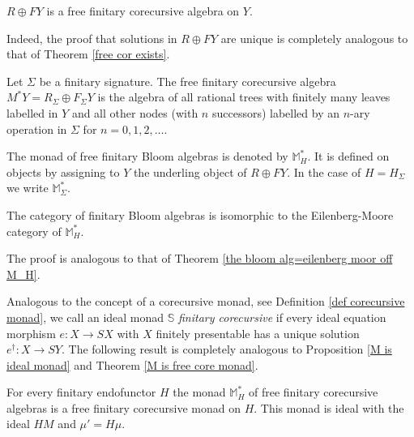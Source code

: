 \documentclass{LMCS}
\theoremstyle{plain}
\theoremstyle{definition}
\numberwithin{equation}{section}
\begin{document}
\begin{cor}
$R\oplus FY$ is a free finitary corecursive algebra on $Y$.
\end{cor}
Indeed, the proof that solutions in $R\oplus FY$ are unique is completely analogous to that of Theorem \ref{free cor exists}.


\begin{exa}
Let $\Sigma$ be a finitary signature. The free finitary corecursive algebra $M^*Y=R_\Sigma\oplus F_\Sigma Y$ is the algebra of all rational trees with finitely many leaves labelled in $Y$ and all other nodes (with $n$ successors) labelled by an $n$-ary operation in $\Sigma$ for $n=0, 1, 2, \ldots$.
\end{exa}


\begin{nota}
The monad of free finitary Bloom algebras is denoted by $\mathbb M_H^*$. It is defined on objects by assigning to $Y$ the underling object of $R\oplus FY$. In the case of $H=H_\Sigma$ we write $\mathbb M^*_\Sigma$.
\end{nota}

\begin{thm}
The category of finitary Bloom algebras is isomorphic to the Eilenberg-Moore category of ${\mathbb M_H^*}$.
\end{thm}

The proof is analogous to that of Theorem \ref{the bloom alg=eilenberg moor off M_H}.


\begin{rem}
Analogous to the concept of a corecursive monad, see Definition \ref{def corecursive monad}, we call an ideal monad $\mathbb S$ \emph{finitary corecursive} if every ideal equation morphism $e:X\to SX$ with $X$ finitely presentable has a unique solution $e^\dag:X\to SY$. The following result is completely analogous to Proposition \ref{M is ideal monad} and Theorem \ref{M is free core monad}.
\end{rem}

\begin{thm}
For every finitary endofunctor $H$ the monad $\mathbb M^*_H$ of free finitary corecursive algebras is a free finitary corecursive monad on $H$. This monad is ideal with the ideal $HM$ and $\mu'=H\mu$.
\end{thm}
\end{document}
